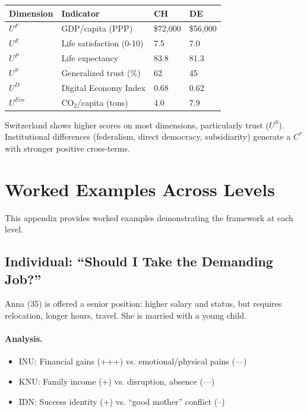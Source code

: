 \documentclass[12pt,a4paper]{article}
\begin{document}
\begin{center}
\renewcommand{\arraystretch}{1.2}
\begin{tabular}{llll}
\hline
\textbf{Dimension} & \textbf{Indicator} & \textbf{CH} & \textbf{DE} \\
\hline
$U^F$ & GDP/capita (PPP) & \$72,000 & \$56,000 \\
$U^E$ & Life satisfaction (0-10) & 7.5 & 7.0 \\
$U^P$ & Life expectancy & 83.8 & 81.3 \\
$U^S$ & Generalized trust (\%) & 62 & 45 \\
$U^D$ & Digital Economy Index & 0.68 & 0.62 \\
$U^{Eco}$ & CO$_2$/capita (tons) & 4.0 & 7.9 \\
\hline
\end{tabular}
\end{center}

Switzerland shows higher scores on most dimensions, particularly trust ($U^S$).
Institutional differences (federalism, direct democracy, subsidiarity) 
generate a $C^*$ with stronger positive cross-terms.

\section{Worked Examples Across Levels}
\label{app:examples}

This appendix provides worked examples demonstrating the framework at each level.

\subsection{Individual: ``Should I Take the Demanding Job?''}

Anna (35) is offered a senior position: higher salary and status, 
but requires relocation, longer hours, travel. She is married with a young child.

\paragraph{Analysis.}
\begin{itemize}
  \item INU: Financial gains (+++) vs. emotional/physical pains (---)
  \item KNU: Family income (+) vs. disruption, absence (---)
  \item IDN: Success identity (+) vs. ``good mother'' conflict (--)
\end{itemize}
\end{document}
